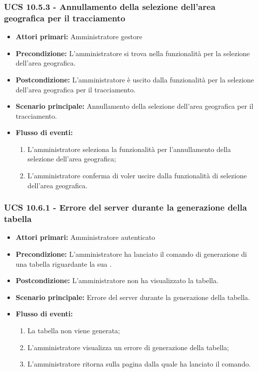 \subsubsection{UCS 10.5.3 - Annullamento della selezione dell'area geografica per il tracciamento}%
\begin{itemize}
\item \textbf{Attori primari:} Amministratore gestore
\item \textbf{Precondizione:} L'amministratore si trova nella funzionalità per la selezione dell'area geografica.
\item \textbf{Postcondizione:} L'amministratore è uscito dalla funzionalità per la selezione dell'area geografica per il tracciamento.
\item \textbf{Scenario principale:} Annullamento della selezione dell'area geografica per il tracciamento.
\item \textbf{Flusso di eventi:}
    \begin{enumerate}
    \item L'amministratore seleziona la funzionalità per l'annullamento della selezione dell'area geografica;
    \item L'amministratore conferma di voler uscire dalla funzionalità di selezione dell'area geografica.
    \end{enumerate} 
\end{itemize}

\subsubsection{UCS 10.6.1 - Errore del server durante la generazione della tabella}
\begin{itemize}
    \item \textbf{Attori primari:} Amministratore autenticato
    \item \textbf{Precondizione:} L'amministratore ha lanciato il comando di generazione di una tabella riguardante la sua .
    \item \textbf{Postcondizione:} L'amministratore non ha visualizzato la tabella.
    \item \textbf{Scenario principale:} Errore del server durante la generazione della tabella.
    \item \textbf{Flusso di eventi:} \begin{enumerate}
    \item La tabella non viene generata;
    \item L'amministratore visualizza un errore di generazione della tabella;
    \item L'amministratore ritorna sulla pagina dalla quale ha lanciato il comando.
    \end{enumerate}
\end{itemize}